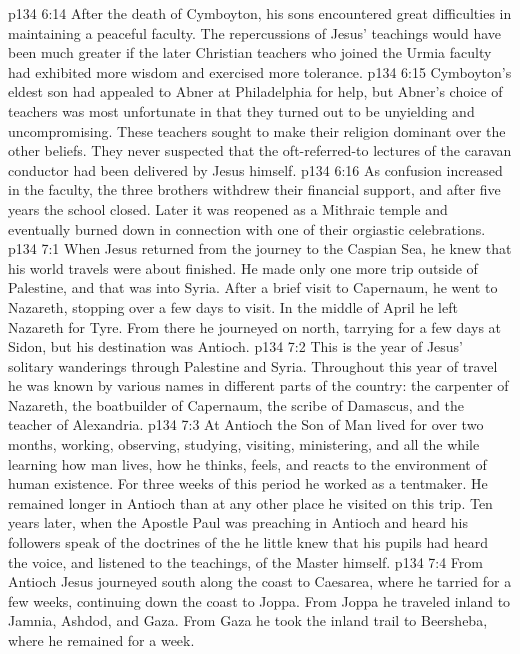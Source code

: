 \separatorshort
\vs p134 6:14 After the death of Cymboyton, his sons encountered great difficulties in maintaining a peaceful faculty. The repercussions of Jesus’ teachings would have been much greater if the later Christian teachers who joined the Urmia faculty had exhibited more wisdom and exercised more tolerance.
\vs p134 6:15 Cymboyton’s eldest son had appealed to Abner at Philadelphia for help, but Abner’s choice of teachers was most unfortunate in that they turned out to be unyielding and uncompromising. These teachers sought to make their religion dominant over the other beliefs. They never suspected that the oft\hyp{}referred\hyp{}to lectures of the caravan conductor had been delivered by Jesus himself.
\vs p134 6:16 As confusion increased in the faculty, the three brothers withdrew their financial support, and after five years the school closed. Later it was reopened as a Mithraic temple and eventually burned down in connection with one of their orgiastic celebrations.
\vs p134 7:1 When Jesus returned from the journey to the Caspian Sea, he knew that his world travels were about finished. He made only one more trip outside of Palestine, and that was into Syria. After a brief visit to Capernaum, he went to Nazareth, stopping over a few days to visit. In the middle of April he left Nazareth for Tyre. From there he journeyed on north, tarrying for a few days at Sidon, but his destination was Antioch.
\vs p134 7:2 This is the year of Jesus’ solitary wanderings through Palestine and Syria. Throughout this year of travel he was known by various names in different parts of the country: the carpenter of Nazareth, the boatbuilder of Capernaum, the scribe of Damascus, and the teacher of Alexandria.
\vs p134 7:3 At Antioch the Son of Man lived for over two months, working, observing, studying, visiting, ministering, and all the while learning how man lives, how he thinks, feels, and reacts to the environment of human existence. For three weeks of this period he worked as a tentmaker. He remained longer in Antioch than at any other place he visited on this trip. Ten years later, when the Apostle Paul was preaching in Antioch and heard his followers speak of the doctrines of the  he little knew that his pupils had heard the voice, and listened to the teachings, of the Master himself.
\vs p134 7:4 From Antioch Jesus journeyed south along the coast to Caesarea, where he tarried for a few weeks, continuing down the coast to Joppa. From Joppa he traveled inland to Jamnia, Ashdod, and Gaza. From Gaza he took the inland trail to Beersheba, where he remained for a week.
